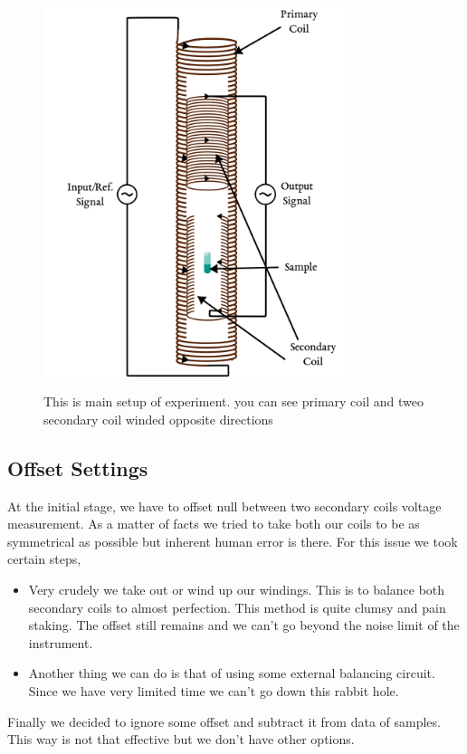 \begin{figure}[hbt!]
  \centering\includegraphics[width=0.8\textwidth]{coils.png}
  \label{assembly}
  \caption{This is main setup of experiment. you can see primary coil and tweo secondary coil winded opposite directions}
\end{figure}

\subsection{Offset Settings}
At the initial stage, we have to offset null between two secondary coils voltage measurement. As a matter of facts we tried to take both our coils to be as symmetrical as possible but inherent human error is there. For this issue we took certain steps,

  
\vskip1cm
\begin{itemize}
\item Very crudely we take out or wind up our windings. This is to balance both secondary coils to almost perfection. This method is quite clumsy and pain staking. The offset still remains and we can’t go beyond the noise limit of the instrument.
\vskip1cm
\item Another thing we can do is that of using some external balancing circuit. Since we have very limited time we can’t go down this rabbit hole.
\end{itemize}
\vskip1cm
Finally we decided to ignore some offset and subtract it from data of samples. This way is not that effective but we don’t have other options.


